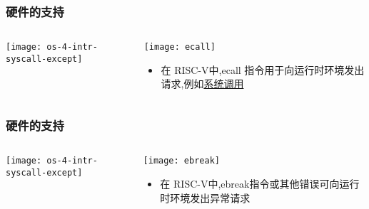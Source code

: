 \begin{frame}
	\frametitle{硬件的支持}
	\begin{columns}
	
	\begin{column}{0.5\textwidth}
		\centering
		\texttt{[image: os-4-intr-syscall-except]}
	\end{column}
	
	\begin{column}{0.5\textwidth}
				
		\centering
		\texttt{[image: ecall]}	
			
		\begin{itemize}
		\item 在 RISC-V中,ecall 指令用于向运行时环境发出请求,例如\underline{系统调用}
		\end{itemize}		
	
	\end{column}
	
\end{columns}

\end{frame}


\begin{frame}
	\frametitle{硬件的支持}
	\begin{columns}
		
		\begin{column}{0.5\textwidth}
			\centering
			\texttt{[image: os-4-intr-syscall-except]}
		\end{column}
		
		\begin{column}{0.5\textwidth}
			
			\centering
			\texttt{[image: ebreak]}	
			
			\begin{itemize}
				\item 在 RISC-V中,ebreak指令或其他错误可向运行时环境发出异常请求
			\end{itemize}		
			
		\end{column}
		
	\end{columns}
	
\end{frame}


